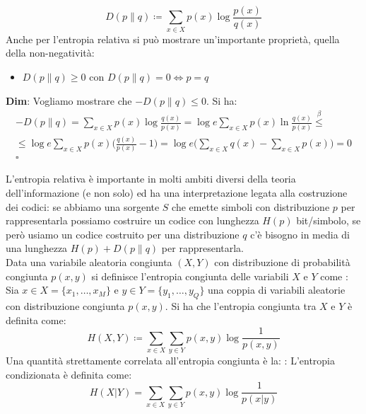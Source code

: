 \begin{equation}
D(p\|q) \coloneqq \sum_{x \in X} p(x) \log \frac{p(x)}{q(x)}
\end{equation}
Anche per l'entropia relativa si pu\`o mostrare un'importante propriet\`a, quella della non-negativit\`a:
\begin{itemize}
    \item $D(p \| q) \geq 0$ con $D(p \| q) = 0 \iff p = q$
\end{itemize}
\begin{tcolorbox}
\textbf{Dim}: Vogliamo mostrare che $-D(p \| q) \leq 0$. Si ha:
\begin{align*}
    -D(p \| q) = \sum_{x \in X} p(x) \log \frac{q(x)}{p(x)} = \log e \sum_{x \in X} p(x) \ln \frac{q(x)}{p(x)} \overset{\beta}{\leq} \\
    \leq \log e \sum_{x \in X} p(x) \Big ( \frac{q(x)}{p(x)} - 1 \Big ) = \log e \Big ( \sum_{x \in X} q(x) - \sum_{x \in X} p(x) \Big ) = 0 \\
    \square
\end{align*}
\end{tcolorbox}
L'entropia relativa \`e importante in molti ambiti diversi della teoria dell'informazione (e non solo) ed ha una interpretazione legata alla costruzione dei codici: se  abbiamo  una  sorgente $S$ che  emette  simboli con distribuzione $p$ per rappresentarla  possiamo costruire un  codice con lunghezza  $H(p)$ bit/simbolo, se però usiamo un codice costruito per una  distribuzione $q$ c’è bisogno  in media di una lunghezza  $H(p)+D(p\|q)$ per rappresentarla. \\
Data una variabile aleatoria congiunta $(X, Y)$ con distribuzione di probabilit\`a congiunta $p(x,y)$ si definisce l'entropia congiunta delle variabili $X$ e $Y$ come
: \\ Sia $x \in X = \{x_1, \dots, x_M \}$ e $y \in Y = \{y_1, \dots, y_Q \}$ una coppia di variabili aleatorie con distribuzione congiunta $p(x,y)$. Si ha che l'entropia congiunta tra $X$ e $Y$ \`e definita come:
\begin{equation}
H(X,Y) \coloneqq \sum_{x \in X} \sum_{y \in Y} p(x,y) \log \frac{1}{p(x,y)}
\end{equation}
Una quantit\`a strettamente correlata all'entropia congiunta \`e la:
: L'entropia condizionata \`e definita come:
\begin{equation}
H(X|Y) = \sum_{x \in X} \sum_{y \in Y} p(x,y) \log \frac{1}{p(x|y)}
\end{equation}
